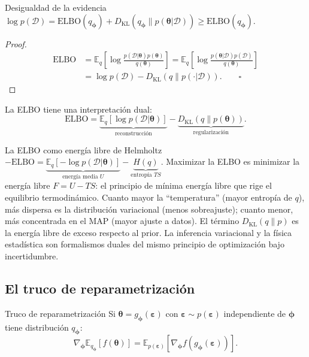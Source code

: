 \begin{teorema}{Desigualdad de la evidencia}
\label{thm:elbo}
$\log p(\mathcal{D}) = \text{ELBO}(q_{\bm{\phi}}) +
D_{\text{KL}}(q_{\bm{\phi}}\|p(\bm{\theta}|\mathcal{D})) \geq
\text{ELBO}(q_{\bm{\phi}})$.
\end{teorema}

\begin{proof}
\begin{align*}
  \text{ELBO}
  &= \mathbb{E}_{q}\!\left[\log\frac{p(\mathcal{D}|\bm{\theta})
  p(\bm{\theta})}{q(\bm{\theta})}\right]
  = \mathbb{E}_{q}\!\left[\log\frac{p(\bm{\theta}|\mathcal{D})
  p(\mathcal{D})}{q(\bm{\theta})}\right] \\
  &= \log p(\mathcal{D})
  - D_{\text{KL}}(q\|p(\cdot|\mathcal{D})).
  \qquad\square
\end{align*}
\end{proof}

La ELBO tiene una interpretación dual:
\begin{equation}
  \text{ELBO}
  = \underbrace{\mathbb{E}_{q}[\log p(\mathcal{D}|\bm{\theta})]}_{\text{reconstrucción}}
  - \underbrace{D_{\text{KL}}(q\|p(\bm{\theta}))}_{\text{regularización}}.
  \label{eq:elbo_dual}
\end{equation}

\begin{fisicaconexion}{La ELBO como energía libre de Helmholtz}
\label{fc:elbo_helmholtz}
$-\text{ELBO} = \underbrace{\mathbb{E}_q[-\log p(\mathcal{D}|
\bm{\theta})]}_{\text{energía media } U} -
\underbrace{H(q)}_{\text{entropía } TS}$. Maximizar la ELBO es
minimizar la energía libre $F = U - TS$: el principio de mínima
energía libre que rige el equilibrio termodinámico. Cuanto mayor la
``temperatura'' (mayor entropía de $q$), más dispersa es la distribución
variacional (menos sobreajuste); cuanto menor, más concentrada en el MAP
(mayor ajuste a datos). El término
$D_{\text{KL}}(q\|p)$ es la energía libre de exceso respecto al prior.
La inferencia variacional y la física estadística son formalismos duales
del mismo principio de optimización bajo incertidumbre.
\end{fisicaconexion}

\subsection{El truco de reparametrización}
\label{subsec:reparam}

\begin{definicion}{Truco de reparametrización}
\label{def:reparam}
Si $\bm{\theta} = g_{\bm{\phi}}(\bm{\varepsilon})$ con
$\bm{\varepsilon} \sim p(\bm{\varepsilon})$ independiente de
$\bm{\phi}$ tiene distribución $q_{\bm{\phi}}$:
\begin{equation}
  \nabla_{\bm{\phi}}\mathbb{E}_{q_{\bm{\phi}}}[f(\bm{\theta})]
  = \mathbb{E}_{p(\bm{\varepsilon})}
  [\nabla_{\bm{\phi}}f(g_{\bm{\phi}}(\bm{\varepsilon}))].
  \label{eq:reparam}
\end{equation}
\end{definicion}

